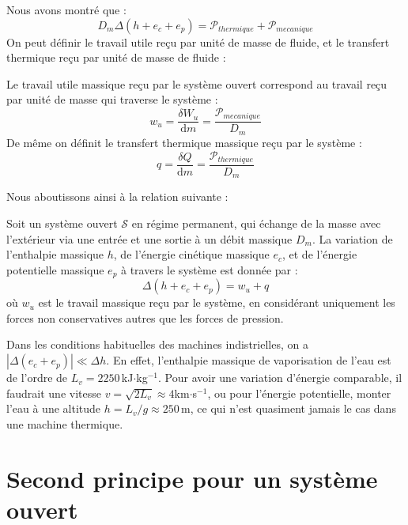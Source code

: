 \documentclass[11pt,fleqn]{book} %
\newcommand{\dd}{\mathrm{d}}
\begin{document}
Nous avons montré que :
\begin{equation}
        D_m \Delta(h + e_c + e_p) = \mathcal{P}_{thermique} + \mathcal{P}_{mecanique}
\end{equation}
On peut définir le travail utile reçu par unité de masse de fluide, et  le transfert thermique reçu par unité de masse de fluide :
\begin{definition}
    Le travail utile massique reçu par le système ouvert correspond au travail reçu par unité de masse qui traverse le système :
    \begin{equation}
        w_u = \frac{\delta W_u}{\dd m} = \frac{\mathcal{P}_{mecanique}}{D_m}
    \end{equation}
    De même on définit le transfert thermique massique reçu par le système :
    \begin{equation}
        q = \frac{\delta Q}{\dd m} = \frac{\mathcal{P}_{thermique}}{D_m}
    \end{equation}
\end{definition}

Nous aboutissons ainsi à la relation suivante :
\begin{theorem}
    Soit un système ouvert $\mathcal{S}$ en régime permanent, qui échange de la masse avec l'extérieur via une entrée et une sortie à un débit massique $D_m$. La variation de l'enthalpie massique $h$, de l'énergie cinétique massique $e_c$, et de l'énergie potentielle massique $e_p$ à travers le système est donnée par :
    \begin{equation}
        \Delta(h + e_c + e_p) = w_u + q
    \end{equation}
    où $w_u$ est le travail massique reçu par le système, en considérant uniquement les forces non conservatives autres que les forces de pression.
\end{theorem}

\begin{remark}
    Dans les conditions habituelles des machines indistrielles, on a $|\Delta(e_c + e_p)| \ll \Delta h$. En effet, l'enthalpie massique de vaporisation de l'eau est de l'ordre de $L_v = 2250$\,kJ$\cdot$kg$^{-1}$. Pour avoir une variation d'énergie comparable, il faudrait une vitesse $v = \sqrt{2 L_v} \approx 4$km$\cdot$s$^{-1}$, ou pour l'énergie potentielle, monter l'eau à une altitude $h = L_v/g \approx 250$\,m, ce qui n'est quasiment jamais le cas dans une machine thermique.
\end{remark}

\section{Second principe pour un système ouvert}
\end{document}
